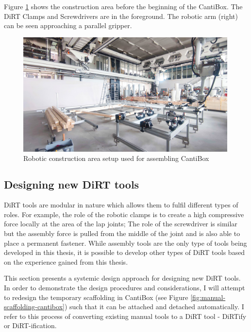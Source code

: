 Figure \ref{fig:robot-area-for-cantibox} shows the construction area before the beginning of the CantiBox. The DiRT Clamps and Screwdrivers are in the foreground. The robotic arm (right) can be seen approaching a parallel gripper. 

\begin{figure}[h!]
    \centering
    \includegraphics[width=0.99\textwidth]{images/10/Construction Area.jpg}
    \caption{Robotic construction area setup used for assembling CantiBox}
    \label{fig:robot-area-for-cantibox}
\end{figure}

\subsection{Designing new DiRT tools}
\label{subsection:discussion-designing-new-dirt-tools}

DiRT tools are modular in nature which allows them to fulfil different types of roles. For example, the role of the robotic clamps is to create a high compressive force locally at the area of the lap joints; The role of the screwdriver is similar but the assembly force is pulled from the middle of the joint and is also able to place a permanent fastener. While assembly tools are the only type of tools being developed in this thesis, it is possible to develop other types of DiRT tools based on the experience gained from this thesis. 

This section presents a systemic design approach for designing new DiRT tools. In order to demonstrate the design procedures and considerations, I will attempt to redesign the temporary scaffolding in CantiBox (see Figure \ref{fig:manual-scaffolding-cantibox}) such that it can be attached and detached automatically. I refer to this process of converting existing manual tools to a DiRT tool - DiRTify or DiRT-ification.

